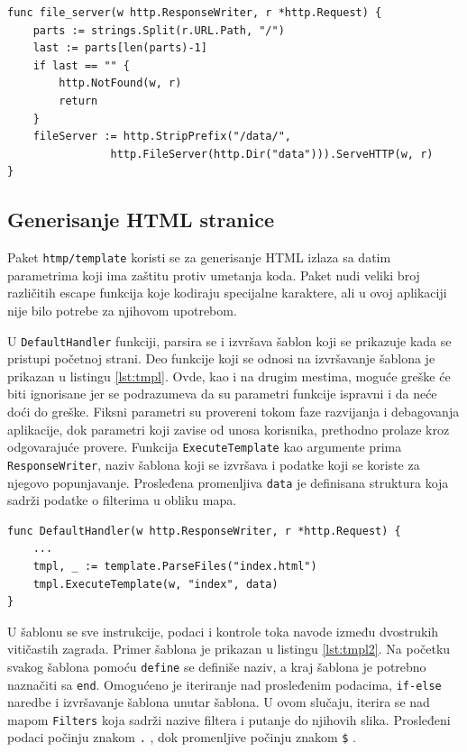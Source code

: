 \documentclass[12pt,oneside]{memoir}
\begin{document}
\begin{center}
\begin{lstlisting}[caption=Hendler za fajl sistem,label={lst:fileserver},  backgroundcolor=\color{background}]
func file_server(w http.ResponseWriter, r *http.Request) {
	parts := strings.Split(r.URL.Path, "/")
	last := parts[len(parts)-1]
	if last == "" {
		http.NotFound(w, r)
		return
	}
	fileServer := http.StripPrefix("/data/", 
				http.FileServer(http.Dir("data"))).ServeHTTP(w, r)
}
\end{lstlisting}
\end{center}

\subsection{Generisanje HTML stranice}

Paket \texttt{htmp/template} koristi se za generisanje HTML izlaza sa datim parametrima koji ima zaštitu protiv umetanja koda. Paket nudi veliki broj različitih escape funkcija koje kodiraju specijalne karaktere, ali u ovoj aplikaciji nije bilo potrebe za njihovom upotrebom. 

U \texttt{DefaultHandler} funkciji, parsira se i izvršava šablon koji se prikazuje kada se pristupi početnoj strani. Deo funkcije koji se odnosi na izvršavanje šablona je prikazan u listingu \ref{lst:tmpl}. Ovde, kao i na drugim mestima, moguće greške će biti ignorisane jer se podrazumeva da su parametri funkcije ispravni i da neće doći do greške. Fiksni parametri su provereni tokom faze razvijanja i debagovanja aplikacije, dok parametri koji zavise od unosa korisnika, prethodno prolaze kroz odgovarajuće provere. Funkcija \texttt{ExecuteTemplate} kao argumente prima \texttt{ResponseWriter}, naziv šablona koji se izvršava i podatke koji se koriste za njegovo popunjavanje. Prosleđena promenljiva \texttt{data} je definisana struktura koja sadrži podatke o filterima u obliku mapa.

\begin{center}
\begin{lstlisting}[caption=Izvršavanje HTML šablona,label={lst:tmpl},  backgroundcolor=\color{background}]
func DefaultHandler(w http.ResponseWriter, r *http.Request) {
	...
	tmpl, _ := template.ParseFiles("index.html")
	tmpl.ExecuteTemplate(w, "index", data)
}
\end{lstlisting}
\end{center}

U šablonu se sve instrukcije, podaci i kontrole toka navode između dvostrukih vitičastih zagrada. Primer šablona je prikazan u listingu \ref{lst:tmpl2}. Na početku svakog šablona pomoću \texttt{define} se definiše naziv, a kraj šablona je potrebno naznačiti sa \texttt{end}. Omogućeno je iteriranje nad prosleđenim podacima, \texttt{if-else} naredbe i izvršavanje šablona unutar šablona. U ovom slučaju, iterira se nad mapom \texttt{Filters} koja sadrži nazive filtera i putanje do njihovih slika. Prosleđeni podaci počinju znakom \texttt{.} , dok promenljive počinju znakom \texttt{\$} \cite{template}.
\end{document}
